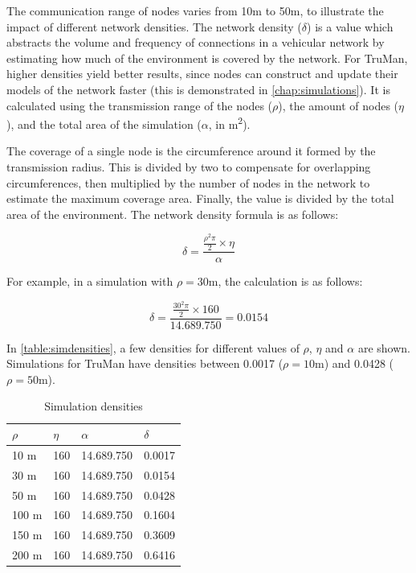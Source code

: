 
The communication range of nodes varies from 10m to 50m, to illustrate the impact of different network densities.
The network density ($\delta$) is a value which abstracts the volume and frequency of connections in a vehicular network by estimating how much of the environment is covered by the network.
For TruMan, higher densities yield better results, since nodes can construct and update their models of the network faster (this is demonstrated in \autoref{chap:simulations}).
It is calculated using the transmission range of the nodes ($\rho$), the amount of nodes ($\eta$), and the total area of the simulation ($\alpha$, in m\textsuperscript{2}).

The coverage of a single node is the circumference around it formed by the transmission radius. This is divided by two to compensate for overlapping circumferences, then multiplied by the number of nodes in the network to estimate the maximum coverage area.
Finally, the value is divided by the total area of the environment.
The network density formula is as follows:

$$ \delta = \frac{\frac{\rho^2\pi}{2} \times \eta}{\alpha} $$

For example, in a simulation with $\rho = 30$m, the calculation is as follows:

$$ \delta = \frac{\frac{30^2\pi}{2} \times 160}{14.689.750} = 0.0154$$

In \autoref{table:simdensities}, a few densities for different values of $\rho$, $\eta$ and $\alpha$ are shown. 
Simulations for TruMan have densities between 0.0017 ($\rho = 10$m) and 0.0428 ($\rho = 50$m).

\begin{table}[h!]
\caption{Simulation densities}
\label{table:simdensities}
\centering
\begin{tabular}{|p{1.5cm}|p{1.5cm}|p{2cm}|p{2cm}|}
 \hline
 $\rho$ & $\eta$ & $\alpha$ & $\delta$ \\
 \hline
 \hline
 10 m & 160 & 14.689.750 & 0.0017 \\
 \hline
 30 m & 160 & 14.689.750 & 0.0154 \\
 \hline
 50 m & 160 & 14.689.750 & 0.0428 \\
 \hline
 100 m & 160 & 14.689.750 & 0.1604 \\
 \hline
 150 m & 160 & 14.689.750 & 0.3609 \\
 \hline
 200 m & 160 & 14.689.750 & 0.6416 \\
 \hline
\end{tabular}
\end{table}


